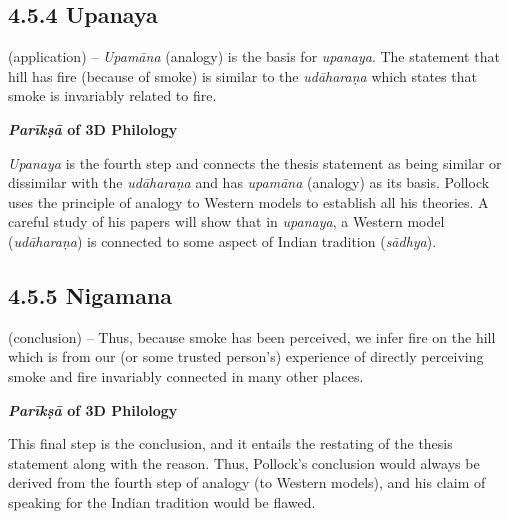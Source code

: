 \subsection*{4.5.4 Upanaya}

(application) – \textit{Upamāna} (analogy) is the basis for \textit{upanaya}. The statement that hill has fire (because of smoke) is similar to the \textit{udāharaṇa} which states that smoke is invariably related to fire.

\textbf{\textit{Parīkṣā} of 3D Philology}

\textit{Upanaya} is the fourth step and connects the thesis statement as being similar or dissimilar with the \textit{udāharaṇa} and has \textit{upamāna} (analogy) as its basis. Pollock uses the principle of analogy to Western models to establish all his theories. A careful study of his papers will show that in \textit{upanaya}, a Western model (\textit{udāharaṇa}) is connected to some aspect of Indian tradition (\textit{sādhya}).


\subsection*{4.5.5 Nigamana}

(conclusion) – Thus, because smoke has been perceived, we infer fire on the hill which is from our (or some trusted person’s) experience of directly perceiving smoke and fire invariably connected in many other places.

\textbf{\textit{Parīkṣā} of 3D Philology}

This final step is the conclusion, and it entails the restating of the thesis statement along with the reason. Thus, Pollock’s conclusion would always be derived from the fourth step of analogy (to Western models), and his claim of speaking for the Indian tradition would be flawed.



